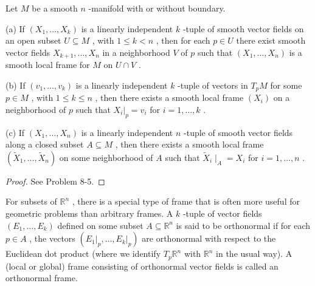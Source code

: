 \begin{proposition}
\label{prop:8-11}
\leanok
{}
Let $M$ be a smooth $n$ -manifold with or without boundary.

(a) If $\left( {{X}_{1},\ldots ,{X}_{k}}\right)$ is a linearly independent $k$ -tuple of smooth vector fields on an open subset $U \subseteq  M$ , with $1 \leq  k < n$ , then for each $p \in  U$ there exist smooth vector fields ${X}_{k + 1},\ldots ,{X}_{n}$ in a neighborhood $V$ of $p$ such that $\left( {{X}_{1},\ldots ,{X}_{n}}\right)$ is a smooth local frame for $M$ on $U \cap  V$ .

(b) If $\left( {{v}_{1},\ldots ,{v}_{k}}\right)$ is a linearly independent $k$ -tuple of vectors in ${T}_{p}M$ for some $p \in  M$ , with $1 \leq  k \leq  n$ , then there exists a smooth local frame $\left( {X}_{i}\right)$ on a neighborhood of $p$ such that ${\left. {X}_{i}\right| }_{p} = {v}_{i}$ for $i = 1,\ldots , k$ .

(c) If $\left( {{X}_{1},\ldots ,{X}_{n}}\right)$ is a linearly independent $n$ -tuple of smooth vector fields along a closed subset $A \subseteq  M$ , then there exists a smooth local frame $\left( {{\widetilde{X}}_{1},\ldots ,{\widetilde{X}}_{n}}\right)$ on some neighborhood of $A$ such that ${\widetilde{X}}_{i}{ \mid  }_{A} = {X}_{i}$ for $i = 1,\ldots , n$ .
\end{proposition}

\begin{proof}
\leanok
See Problem 8-5.
\end{proof}

\begin{definition}
\label{def:8-55-extra-2}
\leanok
For subsets of ${\mathbb{R}}^{n}$ , there is a special type of frame that is often more useful for geometric problems than arbitrary frames. A $k$ -tuple of vector fields $\left( {{E}_{1},\ldots ,{E}_{k}}\right)$ defined on some subset $A \subseteq  {\mathbb{R}}^{n}$ is said to be orthonormal if for each $p \in  A$ , the vectors $\left( {{\left. {E}_{1}\right| }_{p},\ldots ,{\left. {E}_{k}\right| }_{p}}\right)$ are orthonormal with respect to the Euclidean dot product (where we identify ${T}_{p}{\mathbb{R}}^{n}$ with ${\mathbb{R}}^{n}$ in the usual way). A (local or global) frame consisting of orthonormal vector fields is called an orthonormal frame.
\end{definition}

